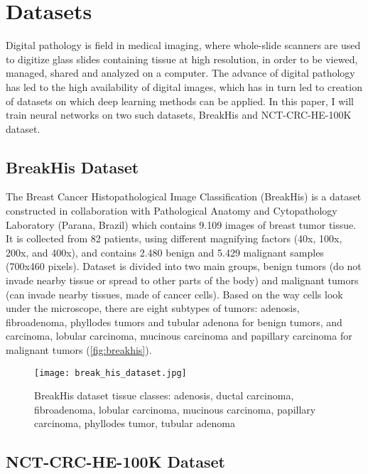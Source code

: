 \section{Datasets}
Digital pathology is field in medical imaging, where whole-slide scanners are used to digitize glass slides containing tissue at high resolution, in order to be viewed, managed, shared and analyzed on a computer. The advance of digital pathology has led to the high availability of digital images, which has in turn led to creation of datasets on which deep learning methods can be applied. In this paper, I will train neural networks on two such datasets, BreakHis and NCT-CRC-HE-100K dataset.

\subsection{BreakHis Dataset}

The Breast Cancer Histopathological Image Classification\cite{breakhis_article} (BreakHis) is a dataset constructed in collaboration with Pathological Anatomy and Cytopathology Laboratory (Parana, Brazil) which contains 9.109 images of breast tumor tissue. It is collected from 82 patients, using different magnifying factors (40x, 100x, 200x, and 400x), and contains 2.480  benign and 5.429 malignant samples (700x460 pixels). Dataset is divided into two main groups, benign tumors (do not invade nearby tissue or spread to other parts of the body) and malignant tumors (can invade nearby tissues, made of cancer cells). Based on the way cells look under the microscope, there are eight subtypes of tumors: adenosis, fibroadenoma, phyllodes tumors and tubular adenona for benign tumors, and carcinoma, lobular carcinoma, mucinous carcinoma and papillary carcinoma for malignant tumors (\textcolor{red}{\autoref{fig:breakhis}}).

\captionsetup[figure]{font=scriptsize,labelfont=scriptsize}

\begin{figure}[h]
	\centering
	\texttt{[image: break\_his\_dataset.jpg]}
	\caption{BreakHis dataset tissue classes: adenosis, ductal carcinoma, fibroadenoma, lobular carcinoma, mucinous carcinoma, papillary carcinoma, phyllodes tumor, tubular adenoma}
	\label{fig:breakhis}
\end{figure}

\subsection{NCT-CRC-HE-100K Dataset}

